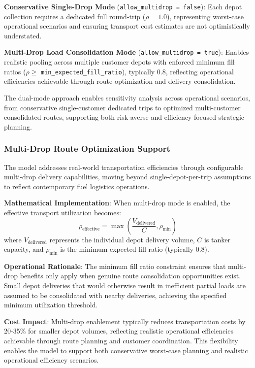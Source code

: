\textbf{Conservative Single-Drop Mode} (\texttt{allow\_multidrop = false}): Each depot collection requires a dedicated full round-trip ($\rho = 1.0$), representing worst-case operational scenarios and ensuring transport cost estimates are not optimistically understated.

\textbf{Multi-Drop Load Consolidation Mode} (\texttt{allow\_multidrop = true}): Enables realistic pooling across multiple customer depots with enforced minimum fill ratios ($\rho \geq$ \texttt{min\_expected\_fill\_ratio}), typically 0.8, reflecting operational efficiencies achievable through route optimization and delivery consolidation.

The dual-mode approach enables sensitivity analysis across operational scenarios, from conservative single-customer dedicated trips to optimized multi-customer consolidated routes, supporting both risk-averse and efficiency-focused strategic planning.

\subsubsection{Multi-Drop Route Optimization Support}
The model addresses real-world transportation efficiencies through configurable multi-drop delivery capabilities, moving beyond single-depot-per-trip assumptions to reflect contemporary fuel logistics operations.

\textbf{Mathematical Implementation}: When multi-drop mode is enabled, the effective transport utilization becomes:
\begin{equation}
\rho_{\text{effective}} = \max\left(\frac{V_{\text{delivered}}}{C}, \rho_{\text{min}}\right)
\end{equation}
where $V_{\text{delivered}}$ represents the individual depot delivery volume, $C$ is tanker capacity, and $\rho_{\text{min}}$ is the minimum expected fill ratio (typically 0.8).

\textbf{Operational Rationale}: The minimum fill ratio constraint ensures that multi-drop benefits only apply when genuine route consolidation opportunities exist. Small depot deliveries that would otherwise result in inefficient partial loads are assumed to be consolidated with nearby deliveries, achieving the specified minimum utilization threshold.

\textbf{Cost Impact}: Multi-drop enablement typically reduces transportation costs by 20-35\% for smaller depot volumes, reflecting realistic operational efficiencies achievable through route planning and customer coordination. This flexibility enables the model to support both conservative worst-case planning and realistic operational efficiency scenarios.

